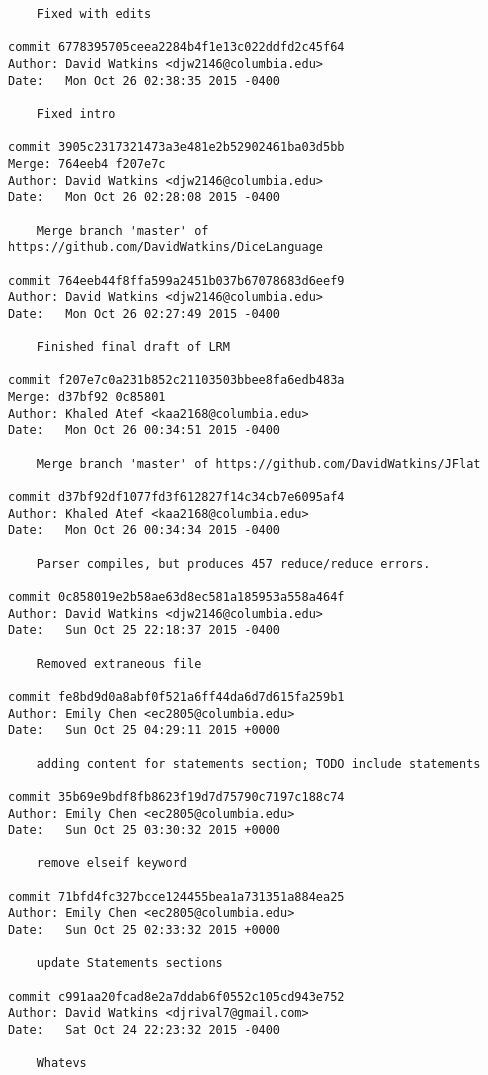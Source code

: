 \begin{verbatim}
    Fixed with edits

commit 6778395705ceea2284b4f1e13c022ddfd2c45f64
Author: David Watkins <djw2146@columbia.edu>
Date:   Mon Oct 26 02:38:35 2015 -0400

    Fixed intro

commit 3905c2317321473a3e481e2b52902461ba03d5bb
Merge: 764eeb4 f207e7c
Author: David Watkins <djw2146@columbia.edu>
Date:   Mon Oct 26 02:28:08 2015 -0400

    Merge branch 'master' of https://github.com/DavidWatkins/DiceLanguage

commit 764eeb44f8ffa599a2451b037b67078683d6eef9
Author: David Watkins <djw2146@columbia.edu>
Date:   Mon Oct 26 02:27:49 2015 -0400

    Finished final draft of LRM

commit f207e7c0a231b852c21103503bbee8fa6edb483a
Merge: d37bf92 0c85801
Author: Khaled Atef <kaa2168@columbia.edu>
Date:   Mon Oct 26 00:34:51 2015 -0400

    Merge branch 'master' of https://github.com/DavidWatkins/JFlat

commit d37bf92df1077fd3f612827f14c34cb7e6095af4
Author: Khaled Atef <kaa2168@columbia.edu>
Date:   Mon Oct 26 00:34:34 2015 -0400

    Parser compiles, but produces 457 reduce/reduce errors.

commit 0c858019e2b58ae63d8ec581a185953a558a464f
Author: David Watkins <djw2146@columbia.edu>
Date:   Sun Oct 25 22:18:37 2015 -0400

    Removed extraneous file

commit fe8bd9d0a8abf0f521a6ff44da6d7d615fa259b1
Author: Emily Chen <ec2805@columbia.edu>
Date:   Sun Oct 25 04:29:11 2015 +0000

    adding content for statements section; TODO include statements

commit 35b69e9bdf8fb8623f19d7d75790c7197c188c74
Author: Emily Chen <ec2805@columbia.edu>
Date:   Sun Oct 25 03:30:32 2015 +0000

    remove elseif keyword

commit 71bfd4fc327bcce124455bea1a731351a884ea25
Author: Emily Chen <ec2805@columbia.edu>
Date:   Sun Oct 25 02:33:32 2015 +0000

    update Statements sections

commit c991aa20fcad8e2a7ddab6f0552c105cd943e752
Author: David Watkins <djrival7@gmail.com>
Date:   Sat Oct 24 22:23:32 2015 -0400

    Whatevs


\end{verbatim}
